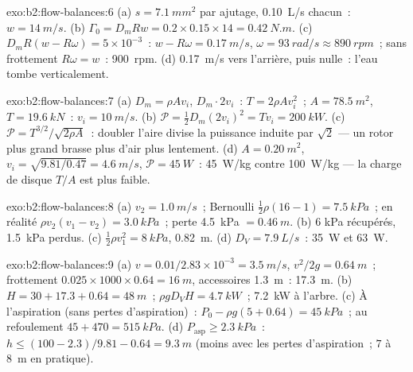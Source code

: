 \begin{solution}{exo:b2:flow-balances:6}
(a) $s = \qty{7.1}{mm^2}$ par ajutage, \qty{0.10}{L/s} chacun~: $w = \qty{14}{m/s}$. (b)
$\Gamma_0 = D_mRw = 0.2 \times 0.15 \times 14 = \qty{0.42}{N.m}$. (c) $D_mR(w - R\omega) =
5 \times 10^{-3}$~: $w - R\omega = \qty{0.17}{m/s}$, $\omega = \qty{93}{rad/s} \approx \qty{890}{rpm}$~;
sans frottement $R\omega = w$~: \qty{900}{rpm}. (d) \qty{0.17}{m/s} vers l'arrière, puis
nulle~: l'eau tombe verticalement.
\end{solution}

\begin{solution}{exo:b2:flow-balances:7}
(a) $D_m = \rho Av_i$,  $D_m\cdot2v_i$~: $T = 2\rho Av_i^2$~; $A = \qty{78.5}{m^2}$,
$T = \qty{19.6}{kN}$~: $v_i = \qty{10}{m/s}$. (b) $\mathcal P = \tfrac12D_m(2v_i)^2 = Tv_i =
\qty{200}{kW}$. (c) $\mathcal P = T^{3/2}/\sqrt{2\rho A}$~: doubler l'aire
divise la puissance induite par $\sqrt2$ --- un rotor plus grand brasse plus d'air
plus lentement. (d) $A = \qty{0.20}{m^2}$, $v_i = \sqrt{9.81/0.47} = \qty{4.6}{m/s}$, $\mathcal P
= \qty{45}{W}$~: \qty{45}{W/kg} contre \qty{100}{W/kg} --- la charge de disque $T/A$
est plus faible.
\end{solution}

\begin{solution}{exo:b2:flow-balances:8}
(a) $v_2 = \qty{1.0}{m/s}$~; Bernoulli $\tfrac12\rho(16 - 1) = \qty{7.5}{kPa}$~; en réalité
$\rho v_2(v_1 - v_2) = \qty{3.0}{kPa}$~; perte \qty{4.5}{kPa} $= \qty{0.46}{m}$. (b) $6$ kPa
récupérés, \qty{1.5}{kPa} perdus. (c) $\tfrac12\rho v_1^2 = \qty{8}{kPa}$, \qty{0.82}{m}. (d)
$D_V = \qty{7.9}{L/s}$~: \qty{35}{W} et \qty{63}{W}.
\end{solution}

\begin{solution}{exo:b2:flow-balances:9}
(a) $v = 0.01/2.83 \times 10^{-3} = \qty{3.5}{m/s}$, $v^2/2g = \qty{0.64}{m}$~; frottement
$0.025 \times 1000 \times 0.64 = \qty{16}{m}$, accessoires \qty{1.3}{m}~: \qty{17.3}{m}. (b)
$H = 30 + 17.3 + 0.64 = \qty{48}{m}$~; $\rho gD_VH = \qty{4.7}{kW}$~; \qty{7.2}{kW} à
l'arbre. (c) À l'aspiration (sans pertes d'aspiration)~: $P_0 - \rho g(5 + 0.64) = \qty{45}{kPa}$~;
au refoulement $45 + 470 = \qty{515}{kPa}$. (d) $P_{\text{asp}} \ge \qty{2.3}{kPa}$~: $h \le (100 -
2.3)/9.81 - 0.64 = \qty{9.3}{m}$ (moins avec les pertes d'aspiration~; $7$ à \qty{8}{m} en
pratique).
\end{solution}

